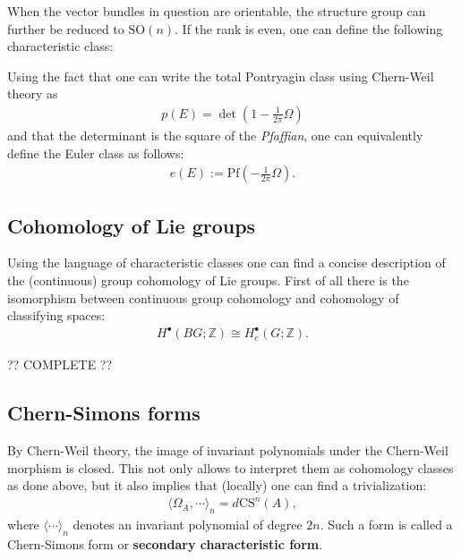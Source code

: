     When the vector bundles in question are orientable, the structure group can further be reduced to $\mathrm{SO}(n)$. If the rank is even, one can define the following characteristic class:
    \begin{property}
        Using the fact that one can write the total Pontryagin class using Chern-Weil theory as
        \begin{gather}
            p(E) = \det\left(1-\frac{1}{2\pi}\Omega\right)
        \end{gather}
        and that the determinant is the square of the \textit{Pfaffian}, one can equivalently define the Euler class as follows:
        \begin{gather}
            e(E) := \mathrm{Pf}\left(-\frac{1}{2\pi}\Omega\right).
        \end{gather}
    \end{property}

\subsection{Cohomology of Lie groups}

    Using the language of characteristic classes one can find a concise description of the (continuous) group cohomology of Lie groups. First of all there is the isomorphism between continuous group cohomology and cohomology of classifying spaces:
    \begin{gather}
        H^\bullet(BG;\mathbb{Z})\cong H^\bullet_c(G;\mathbb{Z}).
    \end{gather}

    ?? COMPLETE ??

\subsection{Chern-Simons forms}\label{section:chern_simons}

    By Chern-Weil theory, the image of invariant polynomials under the Chern-Weil morphism is closed. This not only allows to interpret them as cohomology classes as done above, but it also implies that (locally) one can find a trivialization:
    \begin{gather}
        \langle\Omega_A,\cdots\rangle_n = d\mathrm{CS}^n(A),
    \end{gather}
    where $\langle\cdots\rangle_n$ denotes an invariant polynomial of degree $2n$. Such a form is called a Chern-Simons form or \textbf{secondary characteristic form}.

